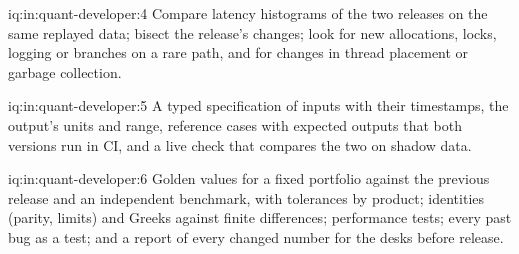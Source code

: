 \begin{solution}{iq:in:quant-developer:4}
Compare latency histograms of the two releases on the same replayed data; bisect the release's changes; look for new
allocations, locks, logging or branches on a rare path, and for changes in thread placement or garbage collection.
\end{solution}

\begin{solution}{iq:in:quant-developer:5}
A typed specification of inputs with their timestamps, the output's units and range, reference cases with expected
outputs that both versions run in CI, and a live check that compares the two on shadow data.
\end{solution}

\begin{solution}{iq:in:quant-developer:6}
Golden values for a fixed portfolio against the previous release and an independent benchmark, with tolerances by product;
identities (parity, limits) and Greeks against finite differences; performance tests; every past bug as a test; and a
report of every changed number for the desks before release.
\end{solution}
